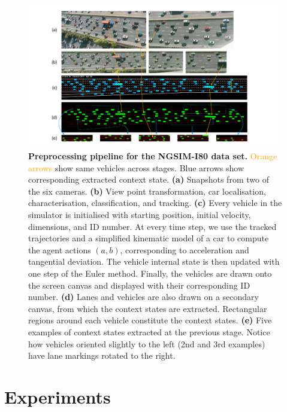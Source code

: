 \documentclass{article}
\begin{document}
\begin{figure}
  \centering
    \includegraphics[width=\textwidth]{images/I-80}
  \caption{
    \textbf{Preprocessing pipeline for the NGSIM-I80 data set.}
    \textcolor{Orange}{Orange arrows} show same vehicles across stages.
    \textcolor{ProcessBlue}{Blue arrows} show corresponding extracted context state.
    \textbf{(a)} Snapshots from two of the six cameras.
    \textbf{(b)} View point transformation, car localisation, characterisation, classification, and tracking.
    \textbf{(c)} Every vehicle in the simulator is initialised with starting position, initial velocity, dimensions, and ID number.
    At every time step, we use the tracked trajectories and a simplified kinematic model of a car to compute the agent actions $(a, b)$, corresponding to acceleration and tangential deviation.
    The vehicle internal state is then updated with one step of the Euler method.
    Finally, the vehicles are drawn onto the screen canvas and displayed with their corresponding ID number.
    \textbf{(d)} Lanes and vehicles are also drawn on a secondary canvas, from which the context states are extracted.
    Rectangular regions around each vehicle constitute the context states.
    \textbf{(e)} Five examples of context states extracted at the previous stage.
    Notice how vehicles oriented slightly to the left (2nd and 3rd examples) have lane markings rotated to the right.
  }
\end{figure}


\section{Experiments}
\end{document}
